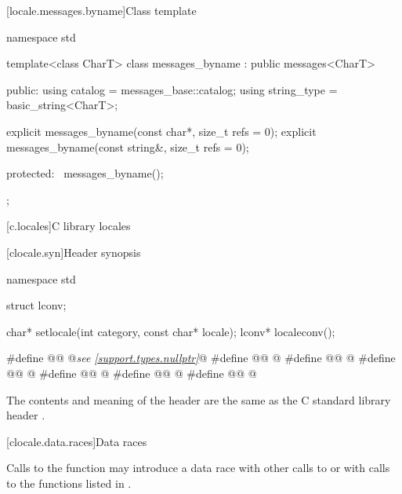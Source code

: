 [locale.messages.byname]{Class template }

%
\begin{codeblock}
namespace std {
  template<class CharT>
    class messages_byname : public messages<CharT> {
    public:
      using catalog     = messages_base::catalog;
      using string_type = basic_string<CharT>;

      explicit messages_byname(const char*, size_t refs = 0);
      explicit messages_byname(const string&, size_t refs = 0);

    protected:
      ~messages_byname();
    };
}
\end{codeblock}

[c.locales]{C library locales}

[clocale.syn]{Header  synopsis}

%
%
%
\begin{codeblock}
namespace std {
  struct lconv;

  char* setlocale(int category, const char* locale);
  lconv* localeconv();
}

#define @@ @\textit{see \ref{support.types.nullptr}}@
#define @@ @\seebelow@
#define @@ @\seebelow@
#define @@ @\seebelow@
#define @@ @\seebelow@
#define @@ @\seebelow@
#define @@ @\seebelow@
\end{codeblock}

\pnum
The contents and meaning of the header 
are the same as the C standard library header .

[clocale.data.races]{Data races}

\pnum
Calls to the function 
may introduce a data race
with other calls to  or
with calls to the functions listed in .


